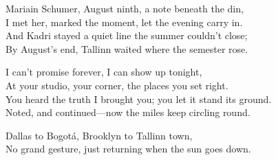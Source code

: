 \begin{lyrics}
Mariain Schumer, August ninth, a note beneath the din,\\
I met her, marked the moment, let the evening carry in.\\
And Kadri stayed a quiet line the summer couldn’t close;\\
By August’s end, Tallinn waited where the semester rose.


I can’t promise forever, I can show up tonight,\\
At your studio, your corner, the places you set right.\\
You heard the truth I brought you; you let it stand its ground.\\
Noted, and continued—now the miles keep circling round.

Dallas to Bogotá, Brooklyn to Tallinn town,\\
No grand gesture, just returning when the sun goes down.
\end{lyrics}

